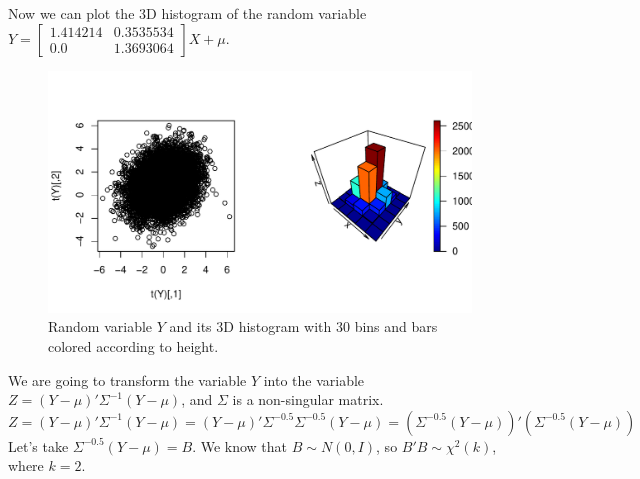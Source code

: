\documentclass[12pt, a4paper]{article}\usepackage[]{graphicx}\usepackage[]{color}
\makeatletter
\def\maxwidth{ %
  \ifdim\Gin@nat@width>\linewidth
    \linewidth
  \else
    \Gin@nat@width
  \fi
}
\newenvironment{knitrout}{}{} %
\makeatother
\begin{document}
Now we can plot the 3D histogram of the random variable $Y = \left[\begin{matrix} 1.414214 & 0.3535534 \\ 0.0 & 1.3693064 \end{matrix} \right]X+\mu$.
\begin{knitrout}
\color{fgcolor}\begin{figure}[H]

{\centering \includegraphics[width=\maxwidth]{figure/ex2_3hist3d-1} 

}

\caption[Random variable $Y$ and its 3D histogram with 30 bins and bars colored according to height]{Random variable $Y$ and its 3D histogram with 30 bins and bars colored according to height.}\label{fig:ex2.3hist3d}
\end{figure}


\end{knitrout}


We are going to transform the variable $Y$ into the variable $Z= (Y-\mu)' \Sigma^{-1} (Y-\mu)$, and $\Sigma$ is a non-singular matrix.
\[
Z = (Y-\mu)' \Sigma^{-1} (Y-\mu) = (Y-\mu)' \Sigma^{-0.5} \Sigma^{-0.5} (Y-\mu) = \left(\Sigma^{-0.5} (Y-\mu)\right)' \left(\Sigma^{-0.5} (Y-\mu)\right)
\]
Let's take $\Sigma^{-0.5} (Y-\mu) = B$. We know that $B \sim N(0,I)$, so $B'B \sim \chi^2(k)$, where $k=2$.
\end{document}
